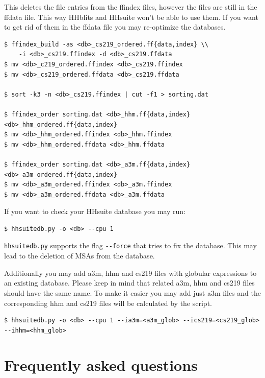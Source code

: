 \documentclass[11pt,a4paper]{article}
\begin{document}
This deletes the file entries from the ffindex files, however the files are still in the ffdata file.
This way HHblits and HHsuite won't be able to use them. If you want to get rid of them in the ffdata file
you may re-optimize the databases.

\begin{verbatim}
$ ffindex_build -as <db>_cs219_ordered.ff{data,index} \\
    -i <db>_cs219.ffindex -d <db>_cs219.ffdata
$ mv <db>_c219_ordered.ffindex <db>_cs219.ffindex
$ mv <db>_cs219_ordered.ffdata <db>_cs219.ffdata

$ sort -k3 -n <db>_cs219.ffindex | cut -f1 > sorting.dat

$ ffindex_order sorting.dat <db>_hhm.ff{data,index} <db>_hhm_ordered.ff{data,index}
$ mv <db>_hhm_ordered.ffindex <db>_hhm.ffindex
$ mv <db>_hhm_ordered.ffdata <db>_hhm.ffdata

$ ffindex_order sorting.dat <db>_a3m.ff{data,index} <db>_a3m_ordered.ff{data,index}
$ mv <db>_a3m_ordered.ffindex <db>_a3m.ffindex
$ mv <db>_a3m_ordered.ffdata <db>_a3m.ffdata
\end{verbatim}

If you want to check your HHsuite database you may run:
\begin{verbatim}
$ hhsuitedb.py -o <db> --cpu 1
\end{verbatim}

\verb`hhsuitedb.py` supports the flag \verb`--force` that tries to fix the database.
This may lead to the deletion of MSAs from the database.

Additionally you may add a3m, hhm and cs219 files with globular expressions to an existing database.
Please keep in mind that related a3m, hhm and cs219 files should have the same name. To make it easier
you may add just a3m files and the corresponding hhm and cs219 files will be calculated by the script.
\begin{verbatim}
$ hhsuitedb.py -o <db> --cpu 1 --ia3m=<a3m_glob> --ics219=<cs219_glob> --ihhm=<hhm_glob>
\end{verbatim}

\section{Frequently asked questions}
\end{document}
